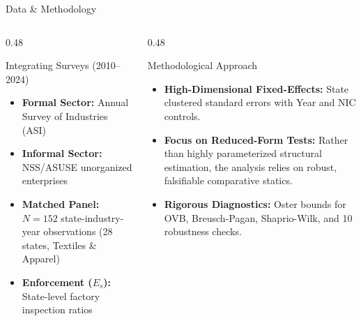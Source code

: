 \documentclass[aspectratio=169, 10pt]{beamer}
\begin{document}
\begin{frame}{Data \& Methodology}

\begin{columns}[T]
\begin{column}{0.48\textwidth}
  \begin{block}{Integrating Surveys (2010–2024)}
    \begin{itemize}
      \item \textbf{Formal Sector:} Annual Survey of Industries (ASI)
      \item \textbf{Informal Sector:} NSS/ASUSE unorganized enterprises
      \item \textbf{Matched Panel:} $N=152$ state-industry-year observations (28 states, Textiles \& Apparel)
      \item \textbf{Enforcement ($E_s$):} State-level factory inspection ratios
    \end{itemize}
  \end{block}
\end{column}
\begin{column}{0.48\textwidth}
  \begin{exampleblock}{Methodological Approach}
    \begin{itemize}
      \item \textbf{High-Dimensional Fixed-Effects:} State clustered standard errors with Year and NIC controls.
      \item \textbf{Focus on Reduced-Form Tests:} Rather than highly parameterized structural estimation, the analysis relies on robust, falsifiable comparative statics.
      \item \textbf{Rigorous Diagnostics:} Oster bounds for OVB, Breusch-Pagan, Shaprio-Wilk, and 10 robustness checks.
    \end{itemize}
  \end{exampleblock}
\end{column}
\end{columns}

\end{frame}
\end{document}
